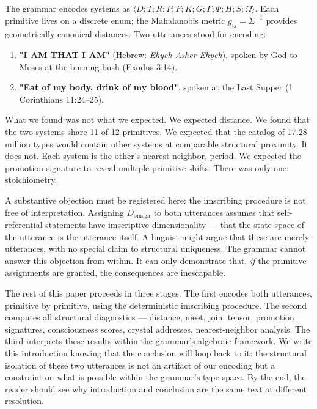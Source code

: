 \documentclass[12pt,a4paper]{article}
\begin{document}
The grammar encodes systems as $\langle D; T; R; P; F; K; G; \Gamma; \Phi; H; S; \Omega \rangle$. Each primitive lives on a discrete enum; the Mahalanobis metric $g_{ij} = \Sigma^{-1}$ provides geometrically canonical distances. Two utterances stood for encoding:

\begin{enumerate}
    \item \textbf{"I AM THAT I AM"} (Hebrew: \emph{Ehyeh Asher Ehyeh}), spoken by God to Moses at the burning bush (Exodus 3:14).
    \item \textbf{"Eat of my body, drink of my blood"}, spoken at the Last Supper (1 Corinthians 11:24--25).
\end{enumerate}

What we found was not what we expected. We expected distance. We found that the two systems share 11 of 12 primitives. We expected that the catalog of 17.28 million types would contain other systems at comparable structural proximity. It does not. Each system is the other's nearest neighbor, period. We expected the promotion signature to reveal multiple primitive shifts. There was only one: stoichiometry.

A substantive objection must be registered here: the imscribing procedure is not free of interpretation. Assigning $D_{\text{omega}}$ to both utterances assumes that self-referential statements have imscriptive dimensionality --- that the state space of the utterance is the utterance itself. A linguist might argue that these are merely utterances, with no special claim to structural uniqueness. The grammar cannot answer this objection from within. It can only demonstrate that, \emph{if} the primitive assignments are granted, the consequences are inescapable.

The rest of this paper proceeds in three stages. The first encodes both utterances, primitive by primitive, using the deterministic imscribing procedure. The second computes all structural diagnostics --- distance, meet, join, tensor, promotion signatures, consciousness scores, crystal addresses, nearest-neighbor analysis. The third interprets these results within the grammar's algebraic framework. We write this introduction knowing that the conclusion will loop back to it: the structural isolation of these two utterances is not an artifact of our encoding but a constraint on what is possible within the grammar's type space. By the end, the reader should see why introduction and conclusion are the same text at different resolution.
\end{document}
